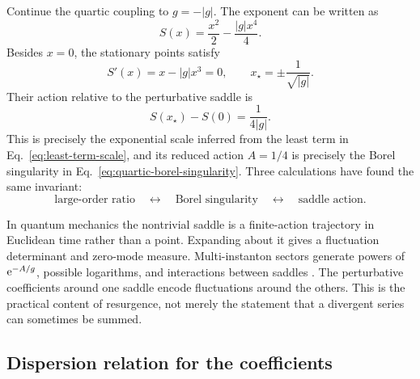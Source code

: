 Continue the quartic coupling to $g=-|g|$.  The exponent can be written as
\begin{equation}
  S(x)=\frac{x^2}{2}-\frac{|g|x^4}{4}.
  \label{eq:continued-quartic-action}
\end{equation}
Besides $x=0$, the stationary points satisfy
\begin{equation}
  S'(x)=x-|g|x^3=0,
  \qquad
  x_\star=\pm\frac{1}{\sqrt{|g|}}.
  \label{eq:quartic-saddles}
\end{equation}
Their action relative to the perturbative saddle is
\begin{equation}
  S(x_\star)-S(0)=\frac{1}{4|g|}.
  \label{eq:quartic-saddle-action}
\end{equation}
This is precisely the exponential scale inferred from the least term in
Eq.~\eqref{eq:least-term-scale}, and its reduced action $A=1/4$ is precisely
the Borel singularity in Eq.~\eqref{eq:quartic-borel-singularity}.  Three
calculations have found the same invariant:
\begin{equation}
  \text{large-order ratio}
  \quad\longleftrightarrow\quad
  \text{Borel singularity}
  \quad\longleftrightarrow\quad
  \text{saddle action}.
  \label{eq:large-order-triangle}
\end{equation}

In quantum mechanics the nontrivial saddle is a finite-action trajectory in
Euclidean time rather than a point.  Expanding about it gives a fluctuation
determinant and zero-mode measure.  Multi-instanton sectors generate powers
of $\mathrm{e}^{-A/g}$, possible logarithms, and interactions between saddles
\cite{Zinn-Justin:1981qzi,Marino:2015Instantons}.  The perturbative coefficients around one saddle
encode fluctuations around the others.  This is the practical content of
resurgence, not merely the statement that a divergent series can sometimes
be summed.

\subsection{Dispersion relation for the coefficients}
\label{subsec:dispersion-large-order}


